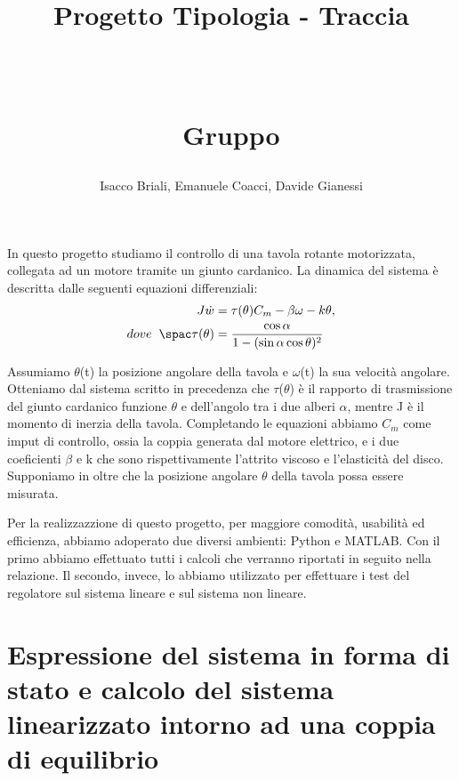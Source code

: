 \documentclass[a4paper, 11pt]{article}
\title{ \vspace{-1in}
		\huge \strut \coursename \strut 
		\\
		\Large  \strut Progetto Tipologia \tipology - Traccia \trace 
		\\
		\Large  \strut \projectname\strut
		\\
		\Large  \strut Gruppo \group\strut
		\vspace{-0.4cm}
}
\author{ Isacco Briali, Emanuele Coacci, Davide Gianessi}
\date{}
\begin{document}
\maketitle
\vspace{-0.5cm}
In questo progetto studiamo il controllo di una tavola rotante motorizzata, collegata ad un motore tramite un giunto cardanico. La dinamica del sistema è descritta dalle seguenti equazioni differenziali:
%
\begin{subequations}\label{eq:system}
\begin{align}
	    J\dot{w} &= \tau(\theta)C_m - \beta\omega - k\theta,
        \\
        dove \hspace{0,2cm} \spac \tau(\theta) &= \frac{\cos{\alpha}}{1-(\sin{\alpha\cos{\theta)^2}}}
\end{align}
\end{subequations}
%

Assumiamo $\theta$(t) la posizione angolare della tavola e $\omega$(t) la sua velocità angolare. Otteniamo dal sistema scritto in precedenza che $\tau$($\theta$) è il rapporto di trasmissione del giunto cardanico funzione $\theta$ e dell'angolo tra i due alberi $\alpha$, mentre J è il momento di inerzia della tavola. Completando le equazioni abbiamo $C_m$ come imput di controllo, ossia la coppia generata dal motore elettrico, e i due coeficienti $\beta$ e k che sono rispettivamente l'attrito viscoso e l'elasticità del disco. Supponiamo in oltre che la posizione angolare $\theta$ della tavola possa essere misurata.

Per la realizzazzione di questo progetto, per maggiore comodità, usabilità ed efficienza, abbiamo adoperato due diversi ambienti: Python e MATLAB. Con il primo abbiamo effettuato tutti i calcoli che verranno riportati in seguito nella relazione. Il secondo, invece, lo abbiamo utilizzato per effettuare i test del regolatore sul sistema lineare e sul sistema non lineare.

\section{Espressione del sistema in forma di stato e calcolo del sistema linearizzato intorno ad una coppia di equilibrio}
\end{document}
